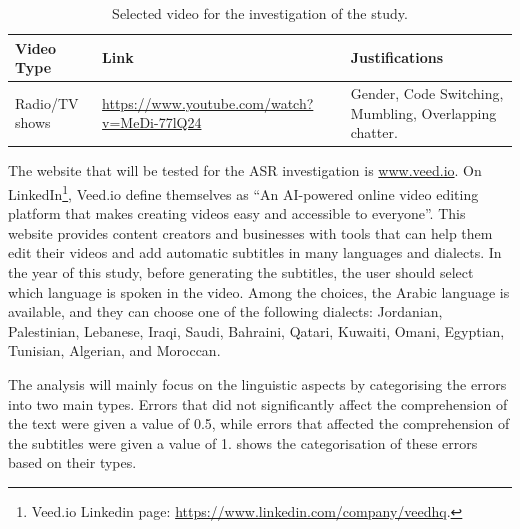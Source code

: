 \documentclass[english]{textolivre}
\begin{document}
\begin{table}[htbp]
\centering
\begin{threeparttable}
\caption{Selected video for the investigation of the study.}
\label{tbl01}
\begin{tabular}{lp{5.5cm}p{5.5cm}}
Video Type & Link & Justifications \\
\midrule
Radio/TV shows & \url{https://www.youtube.com/watch?v=MeDi-77lQ24} & Gender, Code Switching, Mumbling, Overlapping chatter. \\
\bottomrule
\end{tabular}
\end{threeparttable}
\end{table}

The website that will be tested for the ASR investigation is
\href{http://www.veed.io/}{www.veed.io}. On
LinkedIn\footnote{Veed.io Linkedin page:
\url{https://www.linkedin.com/company/veedhq}.}, Veed.io define themselves as
``An AI-powered online video editing platform that makes creating videos
easy and accessible to everyone''. This website provides content
creators and businesses with tools that can help them edit their videos
and add automatic subtitles in many languages and dialects. In the year
of this study, before generating the subtitles, the user should select
which language is spoken in the video. Among the choices, the Arabic
language is available, and they can choose one of the following
dialects: Jordanian, Palestinian, Lebanese, Iraqi, Saudi, Bahraini,
Qatari, Kuwaiti, Omani, Egyptian, Tunisian, Algerian, and Moroccan.

The analysis will mainly focus on the linguistic aspects by categorising
the errors into two main types. Errors that did not significantly affect
the comprehension of the text were given a value of 0.5, while errors
that affected the comprehension of the subtitles were given a value of
1.  shows the categorisation of these errors based on their
types.
	
\end{document}
